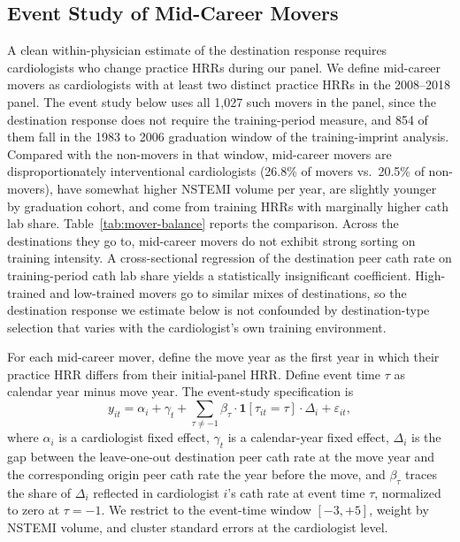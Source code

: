 \documentclass[12pt]{article}
\begin{document}
\subsection{Event Study of Mid-Career Movers}\label{sec:dest-sample}

A clean within-physician estimate of the destination response requires cardiologists who change practice HRRs during our panel. We define mid-career movers as cardiologists with at least two distinct practice HRRs in the 2008--2018 panel. The event study below uses all 1,027 such movers in the panel, since the destination response does not require the training-period measure, and 854 of them fall in the 1983 to 2006 graduation window of the training-imprint analysis. Compared with the non-movers in that window, mid-career movers are disproportionately interventional cardiologists (26.8\% of movers vs.\ 20.5\% of non-movers), have somewhat higher NSTEMI volume per year, are slightly younger by graduation cohort, and come from training HRRs with marginally higher cath lab share. Table~\ref{tab:mover-balance} reports the comparison. Across the destinations they go to, mid-career movers do not exhibit strong sorting on training intensity. A cross-sectional regression of the destination peer cath rate on training-period cath lab share yields a statistically insignificant coefficient. High-trained and low-trained movers go to similar mixes of destinations, so the destination response we estimate below is not confounded by destination-type selection that varies with the cardiologist's own training environment.

For each mid-career mover, define the move year as the first year in which their practice HRR differs from their initial-panel HRR. Define event time $\tau$ as calendar year minus move year. The event-study specification is
\begin{equation}\label{eq:es}
y_{it} = \alpha_i + \gamma_t + \sum_{\tau \neq -1} \beta_\tau \cdot \mathbf{1}[\tau_{it} = \tau] \cdot \Delta_i + \varepsilon_{it},
\end{equation}
where $\alpha_i$ is a cardiologist fixed effect, $\gamma_t$ is a calendar-year fixed effect, $\Delta_i$ is the gap between the leave-one-out destination peer cath rate at the move year and the corresponding origin peer cath rate the year before the move, and $\beta_\tau$ traces the share of $\Delta_i$ reflected in cardiologist $i$'s cath rate at event time $\tau$, normalized to zero at $\tau = -1$. We restrict to the event-time window $[-3, +5]$, weight by NSTEMI volume, and cluster standard errors at the cardiologist level.
\end{document}
